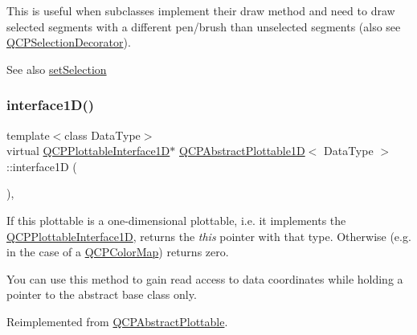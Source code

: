 This is useful when subclasses implement their draw method and need to draw selected segments with a different pen/brush than unselected segments (also see \hyperlink{class_q_c_p_selection_decorator}{Q\+C\+P\+Selection\+Decorator}).

\begin{DoxySeeAlso}{See also}
\hyperlink{class_q_c_p_abstract_plottable_a219bc5403a9d85d3129165ec3f5ae436}{set\+Selection} 
\end{DoxySeeAlso}
\mbox{\label{class_q_c_p_abstract_plottable1_d_ab5f14406cf661087a8ed87baea37bc7e}} 
\subsubsection{\texorpdfstring{interface1\+D()}{interface1D()}\hspace{0.1cm}{\footnotesize\ttfamily [1/2]}}
{\footnotesize\ttfamily template$<$class Data\+Type$>$ \\
virtual \hyperlink{class_q_c_p_plottable_interface1_d}{Q\+C\+P\+Plottable\+Interface1D}$\ast$ \hyperlink{class_q_c_p_abstract_plottable1_d}{Q\+C\+P\+Abstract\+Plottable1D}$<$ Data\+Type $>$\+::interface1D (\begin{DoxyParamCaption}{ }\end{DoxyParamCaption})\hspace{0.3cm}{\ttfamily [inline]}, {\ttfamily [virtual]}}

If this plottable is a one-\/dimensional plottable, i.\+e. it implements the \hyperlink{class_q_c_p_plottable_interface1_d}{Q\+C\+P\+Plottable\+Interface1D}, returns the {\itshape this} pointer with that type. Otherwise (e.\+g. in the case of a \hyperlink{class_q_c_p_color_map}{Q\+C\+P\+Color\+Map}) returns zero.

You can use this method to gain read access to data coordinates while holding a pointer to the abstract base class only. 

Reimplemented from \hyperlink{class_q_c_p_abstract_plottable_a81fd9fd5c4f429c074785e2eb238a8e7}{Q\+C\+P\+Abstract\+Plottable}.

\mbox{\label{class_q_c_p_abstract_plottable1_d_a3ab7511c279af967955369606c584dd6}} 
